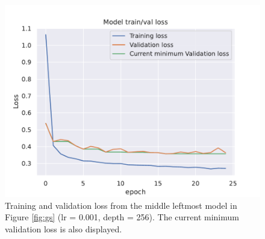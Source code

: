 \documentclass[../main/thesis]{subfiles}
\begin{document}
\begin{figure}
    \centering
    \includegraphics[width=\textwidth]{loss_curve_best_model_gs}
    \caption{\label{fig:loss_curve_from_gs}Training and validation loss from the middle leftmost model in Figure \ref{fig:gs} (lr = 0.001, depth = 256). The current minimum validation loss is also displayed.}
\end{figure}
\end{document}
